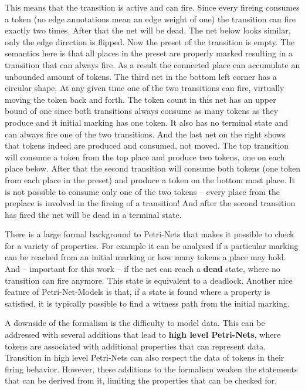 This means that the transition is active and can fire.
Since every fireing consumes a token (no edge annotations mean an edge weight of one) the transition can fire exactly two times.
After that the net will be dead.
The net below looks similar, only the edge direction is flipped.
Now the preset of the transition is empty.
The semantics here is that all places in the preset are properly marked resulting in a transition that can always fire.
As a result the connected place can accumulate an unbounded amount of tokens.
The third net in the bottom left corner has a circular shape.
At any given time one of the two transitions can fire, virtually moving the token back and forth.
The token count in this net has an upper bound of one since both transitions always consume as many tokens as they produce and it initial marking has one token.
It also has no terminal state and can always fire one of the two transitions.
And the last net on the right shows that tokens indeed are produced and consumed, not moved.
The top transition will consume a token from the top place and produce two tokens, one on each place below.
After that the second transition will consume both tokens (one token from each place in the preset) and produce a token on the bottom most place.
It is not possible to consume only one of the two tokens -- every place from the preplace is involved in the fireing of a transition!
And after the second transition has fired the net will be dead in a terminal state.

There is a large formal background to Petri-Nets that makes it possible to check for a variety of properties.
For example it can be analysed if a particular marking can be reached from an initial marking or how many tokens a place may hold.
And -- important for this work -- if the net can reach a \textbf{dead} state, where no transition can fire anymore.
This state is equivalent to a deadlock.
Another nice feature of Petri-Net-Models is that, if a state is found where a property is satisfied, it is typically possible to find a witness path from the initial marking.


A downside of the formalism is the difficulty to model data.
This can be addressed with several additions that lead to \textbf{high level Petri-Nets}, where tokens are associated with additional properties that can represent data.
Transition in high level Petri-Nets can also respect the data of tokens in their firing behavior.
However, these additions to the formalism weaken the statements that can be derived from it, limiting the properties that can be checked for.

